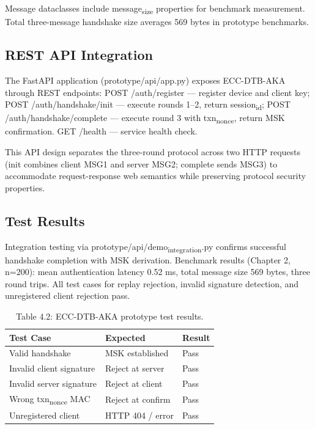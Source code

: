 \indent Message dataclasses include message\textsubscript{size} properties for benchmark measurement. Total three-message handshake size averages 569 bytes in prototype benchmarks.

\subsection{REST API Integration}

\indent The FastAPI application (prototype/api/app.py) exposes ECC-DTB-AKA through REST endpoints: POST /auth/register --- register device and client key; POST /auth/handshake/init --- execute rounds 1--2, return session\textsubscript{id}; POST /auth/handshake/complete --- execute round 3 with txn\textsubscript{nonce}, return MSK confirmation. GET /health --- service health check.

\indent This API design separates the three-round protocol across two HTTP requests (init combines client MSG1 and server MSG2; complete sends MSG3) to accommodate request-response web semantics while preserving protocol security properties.

\subsection{Test Results}

\indent Integration testing via prototype/api/demo\textsubscript{integration}.py confirms successful handshake completion with MSK derivation. Benchmark results (Chapter 2, n=200): mean authentication latency 0.52 ms, total message size 569 bytes, three round trips. All test cases for replay rejection, invalid signature detection, and unregistered client rejection pass.

\begin{table}[htbp]
\centering
\begin{tabular}{lll}
\toprule
Test Case & Expected & Result \\
\midrule
Valid handshake & MSK established & Pass \\
Invalid client signature & Reject at server & Pass \\
Invalid server signature & Reject at client & Pass \\
Wrong txn\textsubscript{nonce} MAC & Reject at confirm & Pass \\
Unregistered client & HTTP 404 / error & Pass \\
\bottomrule
\end{tabular}
\caption{Table 4.2: ECC-DTB-AKA prototype test results.}\label{tbl:4.2}
\end{table}
